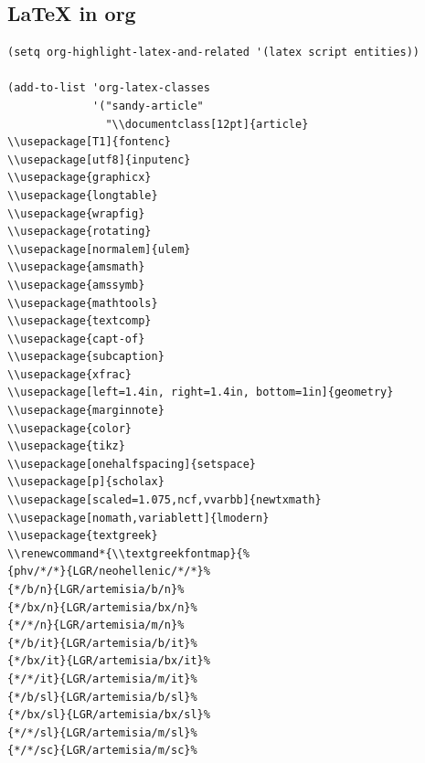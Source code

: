\documentclass[10pt]{article}
\renewcommand*{\textgreekfontmap}{%
{phv/*/*}{LGR/neohellenic/*/*}%
{*/b/n}{LGR/artemisia/b/n}%
{*/bx/n}{LGR/artemisia/bx/n}%
{*/*/n}{LGR/artemisia/m/n}%
{*/b/it}{LGR/artemisia/b/it}%
{*/bx/it}{LGR/artemisia/bx/it}%
{*/*/it}{LGR/artemisia/m/it}%
{*/b/sl}{LGR/artemisia/b/sl}%
{*/bx/sl}{LGR/artemisia/bx/sl}%
{*/*/sl}{LGR/artemisia/m/sl}%
{*/*/sc}{LGR/artemisia/m/sc}%
{*/*/sco}{LGR/artemisia/m/sco}%
}
\begin{document}
\subsection{\LaTeX{} in org}
\label{sec:orga193e15}
\begin{verbatim}
(setq org-highlight-latex-and-related '(latex script entities))

(add-to-list 'org-latex-classes
             '("sandy-article"
               "\\documentclass[12pt]{article}
\\usepackage[T1]{fontenc}
\\usepackage[utf8]{inputenc}
\\usepackage{graphicx}
\\usepackage{longtable}
\\usepackage{wrapfig}
\\usepackage{rotating}
\\usepackage[normalem]{ulem}
\\usepackage{amsmath}
\\usepackage{amssymb}
\\usepackage{mathtools}
\\usepackage{textcomp}
\\usepackage{capt-of}
\\usepackage{subcaption}
\\usepackage{xfrac}
\\usepackage[left=1.4in, right=1.4in, bottom=1in]{geometry}
\\usepackage{marginnote}
\\usepackage{color}
\\usepackage{tikz}
\\usepackage[onehalfspacing]{setspace}
\\usepackage[p]{scholax}
\\usepackage[scaled=1.075,ncf,vvarbb]{newtxmath}
\\usepackage[nomath,variablett]{lmodern}
\\usepackage{textgreek}
\\renewcommand*{\\textgreekfontmap}{%
{phv/*/*}{LGR/neohellenic/*/*}%
{*/b/n}{LGR/artemisia/b/n}%
{*/bx/n}{LGR/artemisia/bx/n}%
{*/*/n}{LGR/artemisia/m/n}%
{*/b/it}{LGR/artemisia/b/it}%
{*/bx/it}{LGR/artemisia/bx/it}%
{*/*/it}{LGR/artemisia/m/it}%
{*/b/sl}{LGR/artemisia/b/sl}%
{*/bx/sl}{LGR/artemisia/bx/sl}%
{*/*/sl}{LGR/artemisia/m/sl}%
{*/*/sc}{LGR/artemisia/m/sc}%

\end{verbatim}
\end{document}
